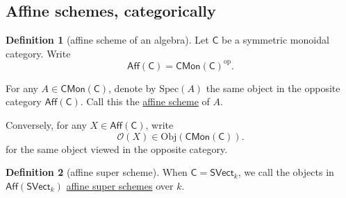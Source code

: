 \documentclass[a4paper,10pt]{scrreprt}
\newcommand{\defn}[1]{\ul{#1}}
\newcommand{\Obj}{\mathrm{Obj}}
\newcommand{\Spec}{\mathrm{Spec}}
\theoremstyle{definition}
\newtheorem{definition}{Definition}[section]
\theoremstyle{plain}
\theoremstyle{remark}
\begin{document}
\subsection{Affine schemes, categorically}
\begin{definition}[affine scheme of an algebra]
  \label{def:affineschemeofanalgebra}
  Let $\mathsf{C}$ be a symmetric monoidal category. Write
  \begin{equation*}
    \mathsf{Aff}(\mathsf{C}) = \mathsf{CMon}(\mathsf{C})^{\text{op}}.
  \end{equation*}

  For any $A \in \mathsf{CMon}(\mathsf{C})$, denote by $\Spec(A)$ the same object in the opposite category $\mathsf{Aff}(\mathsf{C})$. Call this the \defn{affine scheme} of $A$.

  Conversely, for any $X \in \mathsf{Aff}(\mathsf{C})$, write 
  \begin{equation*}
    \mathscr{O}(X) \in \Obj(\mathsf{CMon}(\mathsf{C})).
  \end{equation*}
  for the same object viewed in the opposite category.
\end{definition}

\begin{definition}[affine super scheme]
  \label{def:affinesuperscheme}
  When $\mathsf{C} = \mathsf{SVect}_{k}$, we call the objects in $\mathsf{Aff}(\mathsf{SVect}_{k})$ \defn{affine super schemes} over $k$.
\end{definition}
\end{document}
